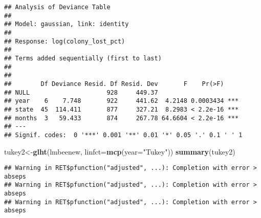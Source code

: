 \documentclass[
]{article}
\newenvironment{Shaded}{\begin{snugshade}}{\end{snugshade}}
\newcommand{\AttributeTok}[1]{\textcolor[rgb]{0.13,0.29,0.53}{#1}}
\newcommand{\FunctionTok}[1]{\textcolor[rgb]{0.13,0.29,0.53}{\textbf{#1}}}
\newcommand{\NormalTok}[1]{#1}
\newcommand{\OtherTok}[1]{\textcolor[rgb]{0.56,0.35,0.01}{#1}}
\newcommand{\StringTok}[1]{\textcolor[rgb]{0.31,0.60,0.02}{#1}}
\begin{document}
\begin{verbatim}
## Analysis of Deviance Table
## 
## Model: gaussian, link: identity
## 
## Response: log(colony_lost_pct)
## 
## Terms added sequentially (first to last)
## 
## 
##        Df Deviance Resid. Df Resid. Dev       F    Pr(>F)    
## NULL                     928     449.37                      
## year    6    7.748       922     441.62  4.2148 0.0003434 ***
## state  45  114.411       877     327.21  8.2983 < 2.2e-16 ***
## months  3   59.433       874     267.78 64.6604 < 2.2e-16 ***
## ---
## Signif. codes:  0 '***' 0.001 '**' 0.01 '*' 0.05 '.' 0.1 ' ' 1
\end{verbatim}

\begin{Shaded}
\begin{Highlighting}[]
\NormalTok{tukey2}\OtherTok{\textless{}{-}}\FunctionTok{glht}\NormalTok{(lmbeenew, }\AttributeTok{linfct=}\FunctionTok{mcp}\NormalTok{(}\AttributeTok{year=}\StringTok{"Tukey"}\NormalTok{))}
\FunctionTok{summary}\NormalTok{(tukey2)}
\end{Highlighting}
\end{Shaded}

\begin{verbatim}
## Warning in RET$pfunction("adjusted", ...): Completion with error > abseps
## Warning in RET$pfunction("adjusted", ...): Completion with error > abseps
## Warning in RET$pfunction("adjusted", ...): Completion with error > abseps
\end{verbatim}
\end{document}
